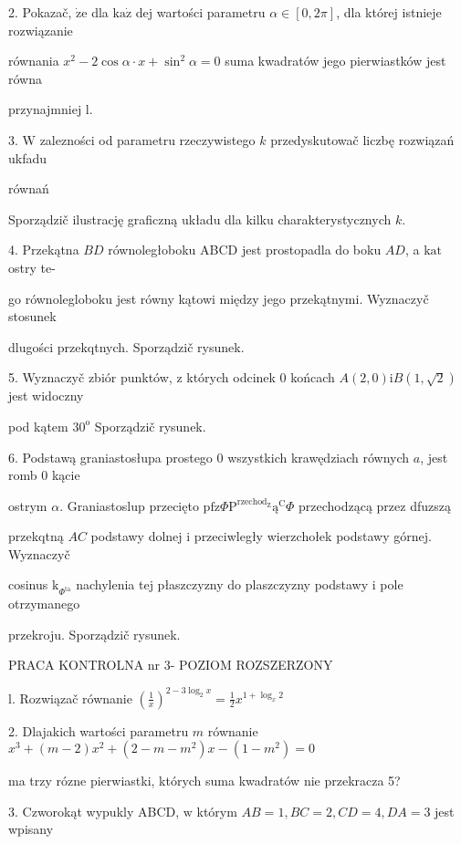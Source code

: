 \documentclass[a4paper,12pt]{article}
\begin{document}
2. Pokazač, $\dot{\mathrm{z}}\mathrm{e}$ dla $\mathrm{k}\mathrm{a}\dot{\mathrm{z}}$ dej wartości parametru $\alpha \in [0,2\pi]$, dla której istnieje rozwiązanie

równania $x^{2}-2\cos\alpha\cdot x+\sin^{2}\alpha= 0$ suma kwadratów jego pierwiastków jest równa

przynajmniej l.

3. $\mathrm{W}$ zalezności od parametru rzeczywistego $k$ przedyskutowač liczbę rozwiązań ukfadu

równań 

Sporządzič ilustrację graficzną układu dla kilku charakterystycznych $k.$

4. Przekątna $BD$ równoległoboku ABCD jest prostopadla do boku $AD$, a $\mathrm{k}\mathrm{a}\mathrm{t}$ ostry te-

go równolegloboku jest równy kątowi między jego przekątnymi. Wyznaczyč stosunek

dlugości przekqtnych. Sporządzič rysunek.

5. Wyznaczyč zbiór punktów, $\mathrm{z}$ których odcinek $0$ końcach $A(2,0)\mathrm{i}B(1,\sqrt{2})$ jest widoczny

pod kątem $30^{\mathrm{o}}$ Sporządzič rysunek.

6. Podstawą graniastosłupa prostego $0$ wszystkich krawędziach równych $a$, jest romb $0$ kącie

ostrym $\alpha$. Graniastoslup przecięto $\mathrm{p}\mathrm{f}\mathrm{z}\Phi \mathrm{P}^{\mathrm{r}\mathrm{z}\mathrm{e}\mathrm{c}\mathrm{h}\mathrm{o}\mathrm{d}_{\mathrm{Z}}}\text{ą}^{\mathrm{C}}\Phi$ przechodzącą przez dfuzszą

przekqtną $AC$ podstawy dolnej $\mathrm{i}$ przeciwległy wierzchołek podstawy górnej. Wyznaczyč

cosinus $\mathrm{k}_{\Phi^{\mathrm{t}\mathrm{a}}}$ nachylenia tej płaszczyzny do plaszczyzny podstawy $\mathrm{i}$ pole otrzymanego

przekroju. Sporządzič rysunek.




PRACA KONTROLNA nr 3- POZIOM ROZSZERZONY

l. Rozwiązač równanie $(\displaystyle \frac{1}{x})^{2-3\log_{2}x}=\frac{1}{2}x^{1+\log_{x}2}$

2. Dlajakich wartości parametru $m$ równanie $x^{3}+(m-2)x^{2}+(2-m-m^{2})x-(1-m^{2})=0$

ma trzy rózne pierwiastki, których suma kwadratów nie przekracza 5?

3. Czworokąt wypukly ABCD, $\mathrm{w}$ którym $AB=1, BC=2, CD=4, DA=3$ jest wpisany
\end{document}
